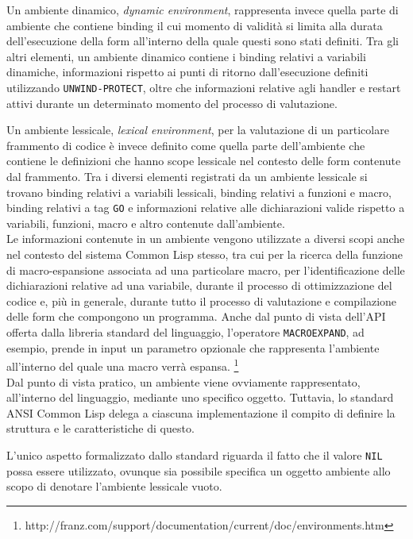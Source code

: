 Un ambiente dinamico, \textit{dynamic environment}, rappresenta invece quella
parte di ambiente che contiene binding il cui momento di validità si limita alla
durata dell'esecuzione della form all'interno della quale questi sono stati
definiti. Tra gli altri elementi, un ambiente dinamico contiene i binding
relativi a variabili dinamiche, informazioni rispetto ai punti di ritorno
dall'esecuzione definiti utilizzando \texttt{UNWIND-PROTECT}, oltre che
informazioni relative agli handler e restart attivi durante un determinato
momento del processo di valutazione.

Un ambiente lessicale, \textit{lexical environment}, per la valutazione di un
particolare frammento di codice è invece definito come quella parte
dell'ambiente che contiene le definizioni che hanno scope lessicale nel contesto
delle form contenute dal frammento. Tra i diversi elementi registrati da un
ambiente lessicale si trovano binding relativi a variabili lessicali, binding
relativi a funzioni e macro, binding relativi a tag \texttt{GO} e informazioni
relative alle dichiarazioni valide rispetto a variabili, funzioni, macro e altro
contenute dall'ambiente.\\

Le informazioni contenute in un ambiente vengono utilizzate a diversi scopi
anche nel contesto del sistema Common Lisp stesso, tra cui per la ricerca della
funzione di macro-espansione associata ad una particolare macro, per
l'identificazione delle dichiarazioni relative ad una variabile, durante il
processo di ottimizzazione del codice e, più in generale, durante tutto il
processo di valutazione e compilazione delle form che compongono un programma.
Anche dal punto di vista dell'API offerta dalla libreria standard del
linguaggio, l’operatore \texttt{MACROEXPAND}, ad esempio, prende in input un
parametro opzionale che rappresenta l’ambiente all’interno del quale una macro
verrà espansa.
\footnote{http://franz.com/support/documentation/current/doc/environments.htm}\\

Dal punto di vista pratico, un ambiente viene ovviamente rappresentato,
all'interno del linguaggio, mediante uno specifico oggetto. Tuttavia, lo
standard ANSI Common Lisp delega a ciascuna implementazione il compito di
definire la struttura e le caratteristiche di questo.

L'unico aspetto formalizzato dallo standard riguarda il fatto che il valore
\texttt{NIL} possa essere utilizzato, ovunque sia possibile specifica un oggetto
ambiente allo scopo di denotare l'ambiente lessicale vuoto.\\

